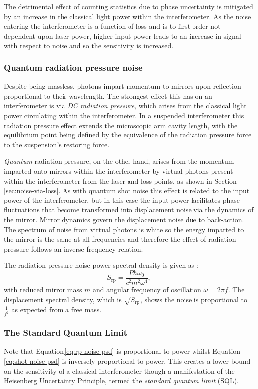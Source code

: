 The detrimental effect of counting statistics due to phase uncertainty is mitigated by an increase in the classical light power within the interferometer. As the noise entering the interferometer is a function of loss and is to first order not dependent upon laser power, higher input power leads to an increase in signal with respect to noise and so the sensitivity is increased.

\subsubsection{\label{sec:quantum-rp-noise}Quantum radiation pressure noise}
Despite being massless, photons impart momentum to mirrors upon reflection proportional to their wavelength. The strongest effect this has on an interferometer is via \emph{\gls{DC} radiation pressure}, which arises from the classical light power circulating within the interferometer. In a suspended interferometer this radiation pressure effect extends the microscopic arm cavity length, with the equilibrium point being defined by the equivalence of the radiation pressure force to the suspension's restoring force.

\emph{Quantum} radiation pressure, on the other hand, arises from the momentum imparted onto mirrors within the interferometer by virtual photons present within the interferometer from the laser and loss points, as shown in Section\,\ref{sec:noise-via-loss}. As with quantum shot noise this effect is related to the input power of the interferometer, but in this case the input power facilitates phase fluctuations that become transformed into displacement noise via the dynamics of the mirror. Mirror dynamics govern the displacement noise due to back-action. The spectrum of noise from virtual photons is white so the energy imparted to the mirror is the same at all frequencies and therefore the effect of radiation pressure follows an inverse frequency relation.

The radiation pressure noise power spectral density is given as \cite{Danilishin2012}:
\begin{equation}
  \label{eq:rp-noise-psd}
  S_{\text{rp}} = \frac{P \hbar \omega_0}{c^2 m^2 \omega^4},
\end{equation}
with reduced mirror mass $m$ and angular frequency of oscillation $\omega = 2 \pi f$. The displacement spectral density, which is $\sqrt{S_{\text{rp}}}$, shows the noise is proportional to $\frac{1}{f^2}$ as expected from a free mass.

\subsubsection{\label{sec:sql}The Standard Quantum Limit}
Note that Equation\,\ref{eq:rp-noise-psd} is proportional to power whilst Equation\,\ref{eq:shot-noise-psd} is inversely proportional to power. This creates a lower bound on the sensitivity of a classical interferometer though a manifestation of the Heisenberg Uncertainty Principle, termed the \emph{standard quantum limit} (\gls{SQL}).

